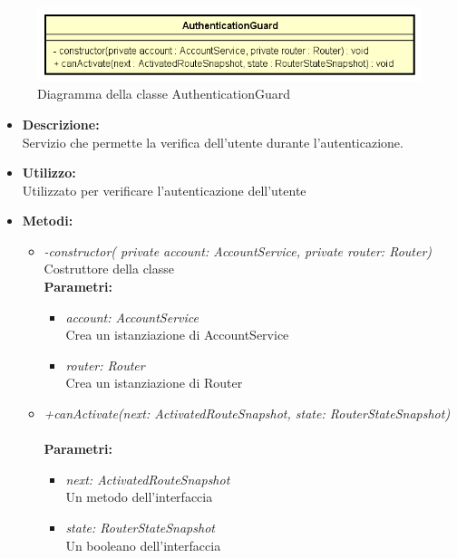 \begin{figure}[h!]
	\centering
	\includegraphics[scale=0.8]{res/sections/SpecificaFrontEnd/Services/Disegnetti/authenticationguard.png}
	\caption{Diagramma della classe AuthenticationGuard}
\end{figure}

\begin{itemize}
	\item \textbf{Descrizione:}\\
	Servizio che permette la verifica dell'utente durante l'autenticazione.
	
	\item \textbf{Utilizzo:}\\
	Utilizzato per verificare l'autenticazione dell'utente
	\item \textbf{Metodi:}
		\begin{itemize}
			\item \emph{-constructor( private account: AccountService, private router: Router)}\\
    		Costruttore della classe\\
    		\textbf{Parametri:}
    		\begin{itemize}
    			\item \emph{account: AccountService}\\
    			Crea un istanziazione di AccountService
    			\item \emph{router: Router}\\
    			Crea un istanziazione di Router
    		\end{itemize}
    		\item \emph{+canActivate(next: ActivatedRouteSnapshot, state: RouterStateSnapshot)}\\
    		\\
    		\textbf{Parametri:}
    		\begin{itemize}
    			\item \emph{next: ActivatedRouteSnapshot}\\
    			Un metodo dell'interfaccia
    			\item \emph{state: RouterStateSnapshot}\\
    			Un booleano dell'interfaccia
    		\end{itemize}
		\end{itemize}
\end{itemize}